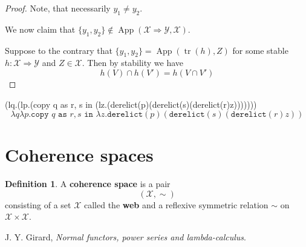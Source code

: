 \documentclass[12pt]{article}
\theoremstyle{plain}
\theoremstyle{definition}
\newtheorem{defn}[thm]{Definition} %
\newcommand{\scr}[1]{\mathscr{#1}}
\begin{document}
\begin{proof}
		Note, that necessarily $y_1 \neq y_2$.
		
		We now claim that $\{ y_1, y_2 \} \not\in \operatorname{App}(\scr{X} \Rightarrow \scr{Y}, \scr{X})$.
		
		Suppose to the contrary that $\{ y_1, y_2 \} = \operatorname{App}(\operatorname{tr}(h), Z)$ for some stable $h: \scr{X} \Rightarrow \scr{Y}$ and $Z \in \scr{X}$. Then by stability we have
		\begin{equation}
			h(V) \cap h(V') = h(V \cap V')
			\end{equation}
		
		\end{proof}
	
	(lq.(lp.(copy q as r, s in (lz.(derelict(p)(derelict(s)(derelict(r)z)))))))
	\begin{equation}
		\lambda q \lambda p. \texttt{copy } q \texttt{ as } r, s \texttt{ in } \lambda z. \texttt{derelict}(p)(\texttt{derelict}(s)(\texttt{derelict}(r)z))
		\end{equation}
	
	
	
	
	
	
	\section{Coherence spaces}
	\begin{defn}
		A \textbf{coherence space} is a pair
		\begin{equation}
			(\scr{X}, \sim)
			\end{equation}
		consisting of a set $\scr{X}$ called the \textbf{web} and a reflexive symmetric relation $\sim$ on $\scr{X} \times \scr{X}$.
		\end{defn}
	
	
	\begin{thebibliography}{9}
		 J. Y. Girard, \emph{Normal functors, power series and lambda-calculus}.
		\end{thebibliography}
	
	
	
	
	
	
\end{document}
